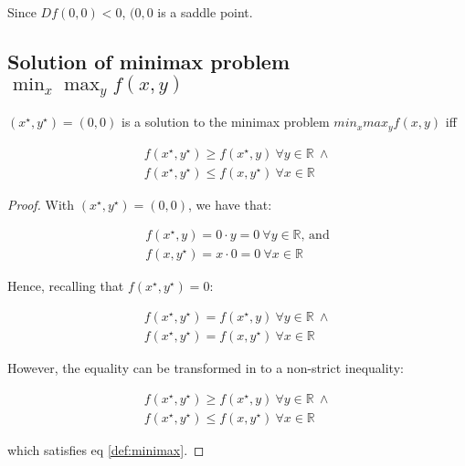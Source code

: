 \documentclass[12pt]{article}
\begin{document}
Since $Df(0, 0) < 0$, $(0, 0$ is a saddle point.

\subsection{Solution of minimax problem $\min_{x} \max_{y} f(x, y)$}

$ (x^{\star},y^{\star})=(0,0)$ is a solution to the minimax problem $min_x max_y f(x,y)$ iff

\begin{equation}
\begin{gathered} \label{def:minimax}
    f(x^{\star},y^{\star}) \geq f(x^{\star},y) \ \forall y \in \mathbb{R} \ \land
    \\ f(x^{\star},y^{\star}) \leq f(x,y^{\star}) \ \forall x \in \mathbb{R}
\end{gathered}
\end{equation}

\begin{proof}
With $(x^{\star}, y^{\star}) = (0, 0)$, we have that:

\begin{equation}
\begin{gathered}
    f(x^{\star}, y) = 0 \cdot y = 0 \ \forall y \in \mathbb{R} \text{, and} \\
    f(x, y^{\star}) = x \cdot 0 = 0 \ \forall x \in \mathbb{R}
\end{gathered}
\end{equation}

Hence, recalling that $f(x^{\star}, y^{\star}) = 0$:

\begin{equation}
\begin{gathered}
    f(x^{\star}, y^{\star}) = f(x^{\star}, y)  \ \forall y \in \mathbb{R} \ \land \\
    f(x^{\star}, y^{\star}) = f(x, y^{\star})  \ \forall x \in \mathbb{R}
\end{gathered}
\end{equation}

However, the equality can be transformed in to a non-strict inequality:

\begin{equation}
\begin{gathered}
    f(x^{\star}, y^{\star}) \geq f(x^{\star}, y)  \ \forall y \in \mathbb{R} \ \land \\
    f(x^{\star}, y^{\star}) \leq f(x, y^{\star})  \ \forall x \in \mathbb{R}
\end{gathered}
\end{equation}

which satisfies eq \eqref{def:minimax}.

\end{proof}
\end{document}
